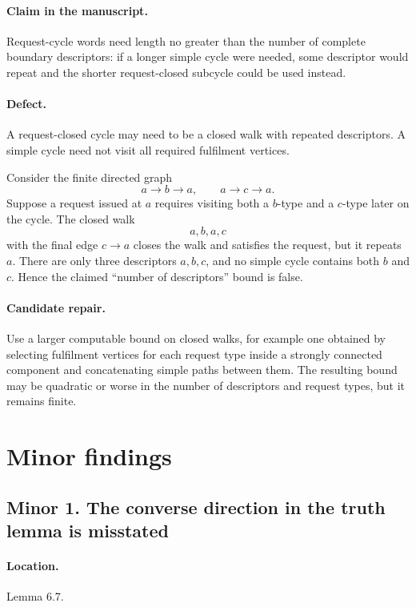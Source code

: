 \documentclass[11pt]{article}
\begin{document}
\paragraph{Claim in the manuscript.} Request-cycle words need length no greater than the number of complete boundary descriptors: if a longer simple cycle were needed, some descriptor would repeat and the shorter request-closed subcycle could be used instead.

\paragraph{Defect.} A request-closed cycle may need to be a closed walk with repeated descriptors. A simple cycle need not visit all required fulfilment vertices.

Consider the finite directed graph
\[
  a\to b\to a,
  \qquad
  a\to c\to a.
\]
Suppose a request issued at $a$ requires visiting both a $b$-type and a $c$-type later on the cycle. The closed walk
\[
  a,b,a,c
\]
with the final edge $c\to a$ closes the walk and satisfies the request, but it repeats $a$. There are only three descriptors $a,b,c$, and no simple cycle contains both $b$ and $c$. Hence the claimed ``number of descriptors'' bound is false.

\paragraph{Candidate repair.} Use a larger computable bound on closed walks, for example one obtained by selecting fulfilment vertices for each request type inside a strongly connected component and concatenating simple paths between them. The resulting bound may be quadratic or worse in the number of descriptors and request types, but it remains finite.

\section{Minor findings}

\subsection*{Minor 1. The converse direction in the truth lemma is misstated}

\paragraph{Location.} Lemma 6.7.
\end{document}
